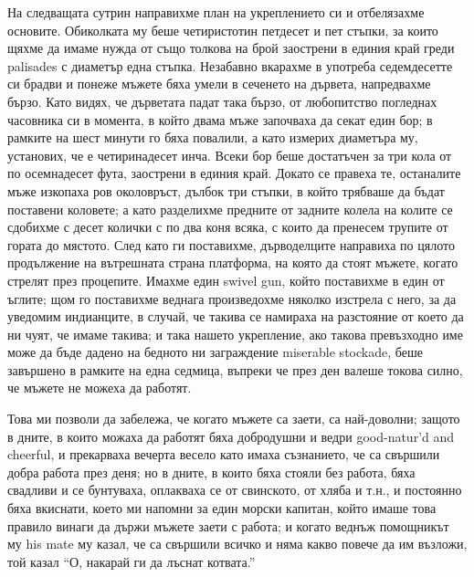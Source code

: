 \documentclass[12pt]{book}
\begin{document}
На следващата сутрин направихме план на укреплението си и отбелязахме основите. Обиколката му беше четиристотин петдесет и пет стъпки, за които щяхме да имаме нужда от също толкова на брой заострени в единия край греди palisades с диаметър една стъпка. Незабавно вкарахме в употреба седемдесетте си брадви и понеже мъжете бяха умели в сеченето на дървета, напредвахме бързо. Като видях, че дърветата падат така бързо, от любопитство погледнах часовника си в момента, в който двама мъже започваха да секат един бор; в рамките на шест минути го бяха повалили, а като измерих диаметъра му, установих, че е четиринадесет инча. Всеки бор беше достатъчен за три кола от по осемнадесет фута, заострени в единия край. Докато се правеха те, останалите мъже изкопаха ров околовръст, дълбок три стъпки, в който трябваше да бъдат поставени коловете; а като разделихме предните от задните колела на колите се сдобихме с десет колички с по два коня всяка, с които да пренесем трупите от гората до мястото. След като ги поставихме, дърводелците направиха по цялото продължение на вътрешната страна платформа, на която да стоят мъжете, когато стрелят през процепите. Имахме един swivel gun, който поставихме в един от ъглите; щом го поставихме веднага произведохме няколко изстрела с него, за да уведомим индианците, в случай, че такива се намираха на разстояние от което да ни чуят,  че имаме такива; и така нашето укрепление, ако такова превъзходно име може да бъде дадено на бедното ни заграждение miserable stockade, беше завършено в рамките на една седмица, въпреки че през ден валеше токова силно, че мъжете не можеха да работят.

Това ми позволи да забележа, че когато мъжете са заети, са най-доволни; защото в дните, в които можаха да работят бяха добродушни и ведри good-natur'd and cheerful, и прекарваха вечерта весело като имаха съзнанието, че са свършили добра работа през деня; но в дните, в които бяха стояли без работа, бяха свадливи и се бунтуваха, оплакваха се от свинското, от хляба и т.н., и постоянно бяха вкиснати, което ми напомни за един морски капитан, който имаше това правило винаги да държи мъжете заети с работа; и когато веднъж помощникът му his mate му казал, че са свършили всичко и няма какво повече да им възложи, той казал “О, накарай ги да лъснат котвата.”  
\end{document}
